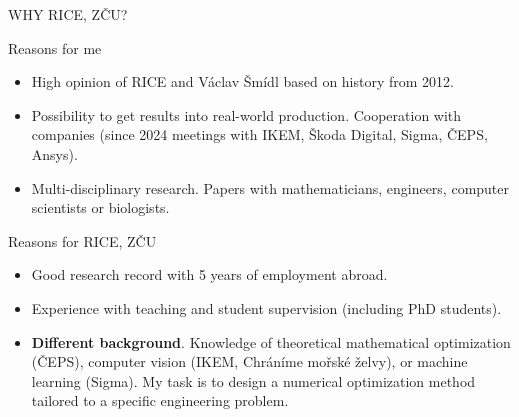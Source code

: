 \documentclass[11pt, aspectratio=169]{beamer}
\newenvironment{wideitemize}{\itemize\addtolength{\itemsep}{10pt}}{\enditemize}
\begin{document}
\begin{frame}{WHY RICE, ZČU?}
\begin{wideitemize}
\item Reasons for me
\begin{itemize}
\item High opinion of RICE and Václav Šmídl based on history from 2012.
\pause \item Possibility to get results into real-world production. Cooperation with companies (since 2024 meetings with IKEM, Škoda Digital, Sigma, ČEPS, Ansys).
\pause \item Multi-disciplinary research. Papers with mathematicians, engineers, computer scientists or biologists.
\end{itemize}
\pause \item Reasons for RICE, ZČU
\begin{itemize}
\item Good research record with 5 years of employment abroad.
\item Experience with teaching and student supervision (including PhD students).
\pause \item \textbf{Different background}. Knowledge of theoretical mathematical optimization (ČEPS), computer vision (IKEM, Chráníme mořské želvy), or machine learning (Sigma). My task is to design a numerical optimization method tailored to a specific engineering problem.
\end{itemize}
\end{wideitemize}
\end{frame}


\end{document}
